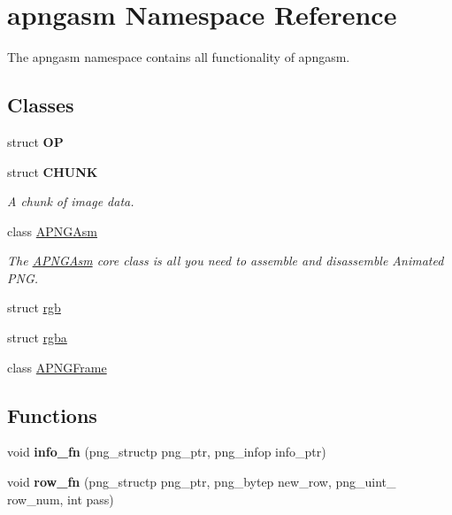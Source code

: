 \hypertarget{namespaceapngasm}{\section{apngasm Namespace Reference}
\label{namespaceapngasm}
}


The apngasm namespace contains all functionality of apngasm.  


\subsection*{Classes}
\begin{DoxyCompactItemize}
\item 
struct {\bfseries O\-P}
\item 
struct {\bfseries C\-H\-U\-N\-K}
\begin{DoxyCompactList}\small\item\em A chunk of image data. \end{DoxyCompactList}\item 
class \hyperlink{classapngasm_1_1APNGAsm}{A\-P\-N\-G\-Asm}
\begin{DoxyCompactList}\small\item\em The \hyperlink{classapngasm_1_1APNGAsm}{A\-P\-N\-G\-Asm} core class is all you need to assemble and disassemble Animated P\-N\-G. \end{DoxyCompactList}\item 
struct \hyperlink{structapngasm_1_1rgb}{rgb}
\item 
struct \hyperlink{structapngasm_1_1rgba}{rgba}
\item 
class \hyperlink{classapngasm_1_1APNGFrame}{A\-P\-N\-G\-Frame}
\end{DoxyCompactItemize}
\subsection*{Functions}
\begin{DoxyCompactItemize}
\item 
\hypertarget{namespaceapngasm_a912714d1b2053741f74a32e0ff537a39}{void {\bfseries info\-\_\-fn} (png\-\_\-structp png\-\_\-ptr, png\-\_\-infop info\-\_\-ptr)}\label{namespaceapngasm_a912714d1b2053741f74a32e0ff537a39}

\item 
\hypertarget{namespaceapngasm_a8ae64735dbdfa76f608abbdd0050ba6e}{void {\bfseries row\-\_\-fn} (png\-\_\-structp png\-\_\-ptr, png\-\_\-bytep new\-\_\-row, png\-\_\-uint\-\_ row\-\_\-num, int pass)}\label{namespaceapngasm_a8ae64735dbdfa76f608abbdd0050ba6e}

\end{DoxyCompactItemize}

